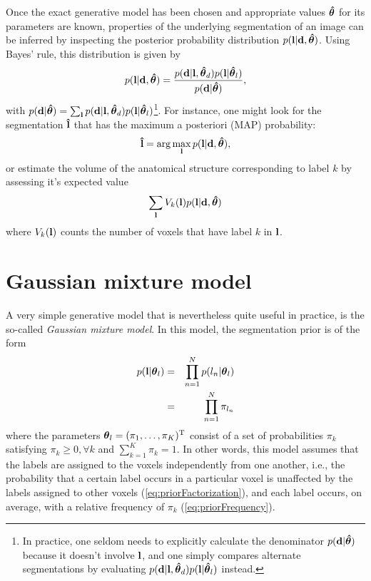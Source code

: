 \documentclass[10pt,twoside]{book}
\begin{document}
Once the exact generative model has been chosen and appropriate values 
${\mbox{\boldmath {${\hat{\theta}}$}}}$
for its parameters are known, properties of the underlying segmentation of an image can be inferred by inspecting the posterior probability distribution $p( \mathbf{l} | \mathbf{d}, {\mbox{\boldmath {${\hat{\theta}}$}}})$. Using Bayes' rule, this distribution is given by
\begin{equation}
  p( \mathbf{l} | \mathbf{d}, {\mbox{\boldmath {${\hat{\theta}}$}}}) = \frac{ p( \mathbf{d} | \mathbf{l}, {\mbox{\boldmath {${\hat{\theta}}$}}}_d ) p( \mathbf{l} | {\mbox{\boldmath {${\hat{\theta}}$}}}_l ) }{ p( \mathbf{d} | {\mbox{\boldmath {${\hat{\theta}}$}}}) },
  \label{eq:posterior}
\end{equation}
with $p( \mathbf{d} | {\mbox{\boldmath {${\hat{\theta}}$}}}) = \sum_{\mathbf{l}} p( \mathbf{d} | \mathbf{l}, {\mbox{\boldmath {${\hat{\theta}}$}}}_d ) p( \mathbf{l} | {\mbox{\boldmath {${\hat{\theta}}$}}}_l )$\footnote{In practice, one seldom needs to explicitly calculate the denominator $p( \mathbf{d} | {\mbox{\boldmath {${\hat{\theta}}$}}})$ because it doesn't involve $\mathbf{l}$, and one simply compares alternate segmentations by evaluating $p( \mathbf{d} | \mathbf{l}, {\mbox{\boldmath {${\hat{\theta}}$}}}_d ) p( \mathbf{l} | {\mbox{\boldmath {${\hat{\theta}}$}}}_l )$ instead.}.
For instance, one might look for the segmentation $\mathbf{\hat{l}}$ that has the maximum a posteriori (MAP) probability:
\begin{equation}
  \mathbf{\hat{l}} = \arg\max_{\mathbf{l}} p( \mathbf{l} | \mathbf{d}, {\mbox{\boldmath {${\hat{\theta}}$}}}),
  \label{eq:MAP}
\end{equation}
or estimate the volume of the anatomical structure corresponding to label $k$ by assessing it's expected value
\begin{equation}
 \sum_{\mathbf{l}} V_k( \mathbf{l} )  p( \mathbf{l} | \mathbf{d}, {\mbox{\boldmath {${\hat{\theta}}$}}} )
  \label{eq:volume}
\end{equation}
where $V_k( \mathbf{l} )$ counts the number of voxels that have label $k$ in $\mathbf{l}$.



\section{Gaussian mixture model}
\label{sec:GMM}

A very simple generative model that is nevertheless quite useful in practice, is the so-called \emph{Gaussian mixture model}. In this model, the segmentation prior is of the form
\begin{eqnarray}
 p( \mathbf{l} | {\mbox{\boldmath {${\theta}$}}}_l ) & = & \prod_{n=1}^N p( l_n | {\mbox{\boldmath {${\theta}$}}}_l ) \label{eq:priorFactorization} \\
                                 & = & \prod_{n=1}^N \pi_{l_n} \label{eq:priorFrequency}
\end{eqnarray}
where the parameters ${\mbox{\boldmath {${\theta}$}}}_l = ( \pi_1, \ldots, \pi_K )^\mathrm{T}$ consist of a set of probabilities $\pi_k$ satisfying $\pi_k \geq 0, \forall k$ and $\sum_{k=1}^K \pi_k = 1$. In other words, this model assumes that the labels are assigned to the voxels independently from one another, i.e., the probability that a certain label occurs in a particular voxel is unaffected by the labels assigned to other voxels (\eqref{eq:priorFactorization}), and each label occurs, on average, with a relative frequency of $\pi_k$ (\eqref{eq:priorFrequency}).
\end{document}
